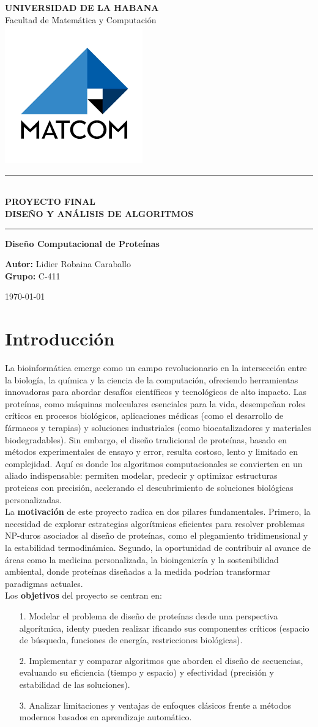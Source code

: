 \documentclass[letterpaper, 12pt]{report}
\newcommand*{\customtitlepage}{
    \begin{titlepage}
        \begin{center}
            \vspace*{1cm}
            
            
            {\LARGE \textbf{UNIVERSIDAD DE LA HABANA}}\\
            \vspace{0.5cm}
            {\Large Facultad de Matem\'atica y Computaci\'on}\\
            

            \includegraphics[scale=0.5]{images/logo.png}
            
            \vspace{1cm}
            
            
            \rule{\textwidth}{1.5pt}\\
            \vspace{0.5cm}
            {\LARGE \textcolor{primary}{\textbf{PROYECTO FINAL}}}\\
            {\LARGE \textcolor{primary}{\textbf{DISE\~NO Y AN\'ALISIS DE ALGORITMOS}}}
            \vspace{0.5cm}
            \rule{\textwidth}{1.5pt}
            
            \vspace{2cm}
            
            {\Large \textbf{Diseño Computacional de Prote\'inas}}\\
            \vspace{1cm}
            
            {\Large \textbf{Autor:} Lidier Robaina Caraballo \\
            \vspace{0.5cm}
            {\Large \textbf{Grupo:} C-411 }\\
            \vspace{1.5cm}
            
            {\Large \today}
            }
        \end{center}
    \end{titlepage}
}
\begin{document}
\customtitlepage

\tableofcontents
\thispagestyle{empty}
\cleardoublepage

\setcounter{page}{1}

\chapter{Introducción}

La bioinform\'atica emerge como un campo revolucionario en la intersección entre la biología, la química y la ciencia de la computación, ofreciendo herramientas innovadoras para abordar desafíos científicos y tecnológicos de alto impacto. Las proteínas, como máquinas moleculares esenciales para la vida, desempeñan roles críticos en procesos biológicos, aplicaciones médicas (como el desarrollo de fármacos y terapias) y soluciones industriales (como biocatalizadores y materiales biodegradables). Sin embargo, el diseño tradicional de proteínas, basado en métodos experimentales de ensayo y error, resulta costoso, lento y limitado en complejidad. Aquí es donde los algoritmos computacionales se convierten en un aliado indispensable: permiten modelar, predecir y optimizar estructuras proteicas con precisión, acelerando el descubrimiento de soluciones biológicas personalizadas.  \\

La \textbf{motivación} de este proyecto radica en dos pilares fundamentales. Primero, la necesidad de explorar estrategias algorítmicas eficientes para resolver problemas NP-duros asociados al diseño de proteínas, como el plegamiento tridimensional y la estabilidad termodinámica. Segundo, la oportunidad de contribuir al avance de áreas como la medicina personalizada, la bioingeniería y la sostenibilidad ambiental, donde proteínas diseñadas a la medida podrían transformar paradigmas actuales. \\

Los \textbf{objetivos} del proyecto se centran en:
\begin{itemize}
    \item[1.] Modelar el problema de diseño de proteínas desde una perspectiva algorítmica, identy pueden realizar ificando sus componentes críticos (espacio de búsqueda, funciones de energía, restricciones biológicas).  
    \item[2.] Implementar y comparar algoritmos que aborden el diseño de secuencias, evaluando su eficiencia (tiempo y espacio) y efectividad (precisión y estabilidad de las soluciones).  
    \item[3.] Analizar limitaciones y ventajas de enfoques clásicos frente a métodos modernos basados en aprendizaje automático.  
\end{itemize}
\end{document}
